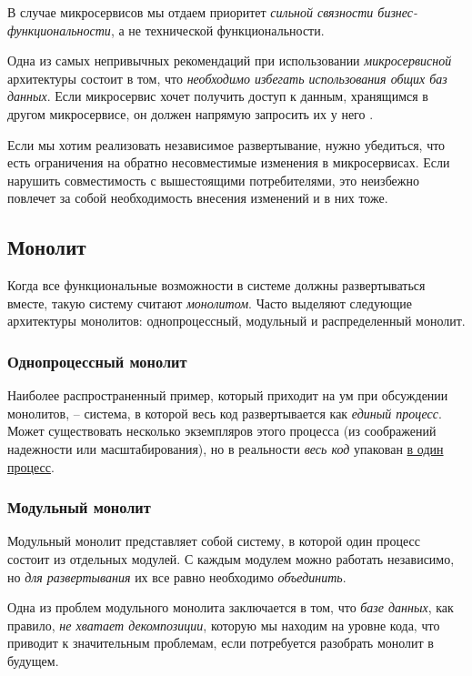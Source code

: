\documentclass[%
	11pt,
	a4paper,
	utf8,
		]{article}
\begin{document}
В случае микросервисов мы отдаем приоритет \emph{сильной связности бизнес-функциональности}, а не технической функциональности. 

Одна из самых непривычных рекомендаций при использовании \emph{микросервисной} архитектуры состоит в том, что {\color{red}\itshape необходимо избегать использования общих баз данных}. Если микросервис хочет получить доступ к данным, хранящимся в другом микросервисе, он должен напрямую запросить их у него \cite[]{microservices-2024}.

Если мы хотим реализовать независимое развертывание, нужно убедиться, что есть ограничения на обратно несовместимые изменения в микросервисах. Если нарушить совместимость с вышестоящими потребителями, это неизбежно повлечет за собой необходимость внесения изменений и в них тоже.



\subsection{Монолит}

Когда все функциональные возможности в системе должны развертываться вместе, такую систему считают \emph{монолитом}. Часто выделяют следующие архитектуры монолитов: однопроцессный, модульный и распределенный монолит.

\subsubsection{Однопроцессный монолит}

Наиболее распространенный пример, который приходит на ум при обсуждении монолитов, -- система, в которой весь код развертывается как \emph{единый процесс}. Может существовать несколько экземпляров этого процесса (из соображений надежности или масштабирования), но в реальности \emph{весь код} упакован \underline{в один процесс}.

\subsubsection{Модульный монолит}

Модульный монолит представляет собой систему, в которой один процесс состоит из отдельных модулей. С каждым модулем можно работать независимо, но \emph{для развертывания} их все равно необходимо \emph{объединить}.

Одна из проблем модульного монолита заключается в том, что \emph{базе данных}, как правило, \emph{не хватает декомпозиции}, которую мы находим на уровне кода, что приводит к значительным проблемам, если потребуется разобрать монолит в будущем.
\end{document}
